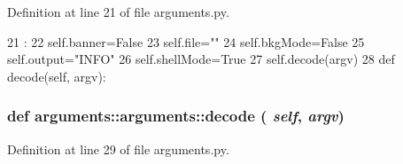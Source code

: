 Definition at line 21 of file arguments.py.


\begin{DoxyCode}
21                                  :
22         self.banner=False
23         self.file=""
24         self.bkgMode=False
25         self.output="INFO"
26         self.shellMode=True
27         self.decode(argv)
28 
    def decode(self, argv):
\end{DoxyCode}
\hypertarget{classarguments_1_1arguments_af121e06284eb522e769b34c01df5d1b4}{
\subsubsection[{decode}]{\setlength{\rightskip}{0pt plus 5cm}def arguments::arguments::decode ( {\em self}, \/   {\em argv})}}
\label{classarguments_1_1arguments_af121e06284eb522e769b34c01df5d1b4}


Definition at line 29 of file arguments.py.


